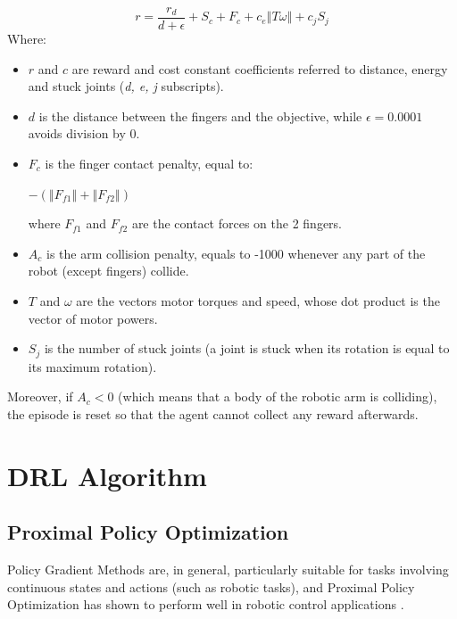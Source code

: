 \documentclass{sig-alternate-05-2015}
\begin{document}
\begin{equation} \label{eq:Reward}
    r = \frac{r_d}{d+\epsilon} + S_c + F_c + c_e \left\Vert  T \omega \right\Vert + c_j S_j
\end{equation}
Where:
\begin{itemize}
    \item $r$ and $c$ are reward and cost constant coefficients referred to distance, energy and stuck joints (\textit{d, e, j} subscripts).
    \item $d$ is the distance between the fingers and the objective, while $\epsilon=0.0001$ avoids division by 0.
    \item $F_c$ is the finger contact penalty, equal to:
    
    $-\left(\left\Vert F_{f1}\right\Vert + \left\Vert F_{f2}\right\Vert \right)$ 
    
    where  $F_{f1}$ and $F_{f2}$ are the contact forces on the 2 fingers.
    \item $A_c$ is the arm collision penalty, equals to -1000 whenever any part of the robot (except fingers) collide.
    \item $T$ and $\omega$ are the vectors  motor torques and speed, whose dot product is the vector of motor powers.
    \item $S_j$ is the number of stuck joints (a joint is stuck when its rotation is equal to its maximum rotation).
\end{itemize}
Moreover, if $A_c<0$ (which means that a body of the robotic arm is colliding), the episode is reset so that the agent cannot collect any reward afterwards.

\section{DRL Algorithm}
\subsection{Proximal Policy Optimization}
Policy Gradient Methods are, in general, particularly suitable for tasks involving continuous states and actions (such as robotic tasks), and Proximal Policy Optimization has shown to perform well in robotic control applications \cite{openai2018HandManipulation}. 
\end{document}
